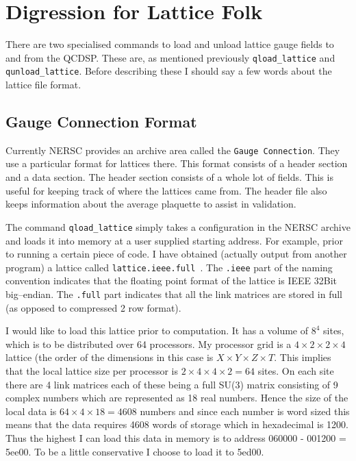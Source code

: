 \section{Digression for Lattice Folk}
There are two specialised commands to load and unload lattice gauge fields to
and from the QCDSP. These are, as mentioned previously {\tt qload\_lattice}
and {\tt qunload\_lattice}. Before describing these I should say a few 
words about the lattice file format.

\subsection{Gauge Connection Format}
Currently NERSC provides an archive area called the {\tt Gauge Connection}.
They use a particular format for lattices there. This format consists
of a header section and a data section. The header section consists of
a whole lot of fields. This is useful for keeping track of where the 
lattices came from. The header file also keeps information about the
average plaquette to assist in validation.

The command {\tt qload\_lattice} simply takes a configuration in the NERSC
archive and loads it into memory at a user supplied starting address.
For example, prior to running a certain piece of code. I have obtained
(actually output from another program) a lattice called {\tt lattice.ieee.full }. The {\tt .ieee} part of the naming convention indicates that the floating point format of the lattice is IEEE 32Bit big--endian. The {\tt .full} part indicates that all the link matrices are stored in full (as opposed to compressed 2 row
format).

I would like to load this lattice prior to computation. It has a volume
of $8^4$ sites, which is to be distributed over 64 processors. My processor
grid is a $4 \times 2 \times 2 \times 4$ lattice (the order of the dimensions
in this case is $X \times Y \times Z \times T$. This implies that the local 
lattice size per processor is $2 \times 4 \times 4 \times 2 = 64$ sites. On
each site there are 4 link matrices each of these being a full SU(3) matrix
consisting of 9 complex numbers which are represented as 18 real numbers.
Hence the size of the local data is $64 \times 4 \times 18 = 4608$ numbers
and since each number is word sized this means that the data requires 
4608 words of storage which in hexadecimal is 1200. Thus the highest I can
load this data in memory is to address 060000 - 001200 = 5ee00. To be 
a little conservative I choose to load it to 5ed00.

